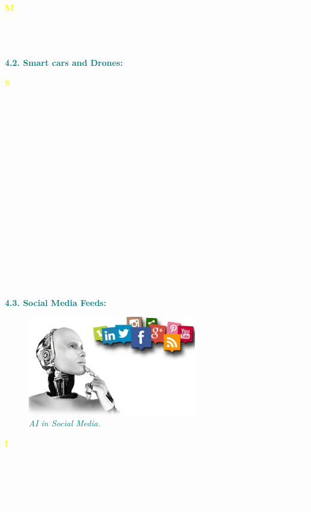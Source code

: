 \documentclass[12pt]{article}
\begin{document}
\textcolor{white}{\textbf{\textcolor{yellow}{\huge M}}ost manufacturers are now incorporating AI into their smartphones, with big chip manufacturers including Qualcomm and Huawei producing chips with built-in AI capabilities. AI integration can help bring features such as scene recognition, mixed and virtual reality elements, and more.}\\

\begin{large}
\textbf{\textcolor{teal}{4.2. Smart cars and Drones:}}\\
\end{large}

\textcolor{white}{\textbf{\textcolor{yellow}{\huge S}}peaking of AI, there is no better and more prominent demonstration of this technology than what smart car and drone manufacturers are doing with it. A few years ago, using a fully automatic car was a dream, but now that companies like Tesla have made so much progress, we already have a fleet of semi-automatic cars on the road.
Companies like Amazon and Walmart are investing heavily in drone delivery programs and this will become a reality sooner than you think. If you think this is too far, note that militaries around the world are already using successful drone programs.}\\\\\\\\\\\\\\\\\\\\\\


\begin{large}
\textbf{\textcolor{teal}{4.3. Social Media Feeds:}}\\
\end{large}
\begin{figure}
\centering
\includegraphics[width=2.9in]{AI-Social-Media-800x470}

\caption{\textit{\textcolor{teal}{AI in Social Media.}}}
\end{figure}
\textcolor{white}{\textbf{\textcolor{yellow}{\huge I}}f you are thinking that smart cars will not affect you personally because they are not in your country or city, what you use on a regular basis. Even if you live under a rock, there is a high probability that you will tweet from under it. If Twitter isn't your poison choice, it could be Facebook or Instagram, or Snapchat, or any social media apps out there. Well, if you use social media, most of your decisions are influenced by artificial intelligence.}\\\\
\end{document}
